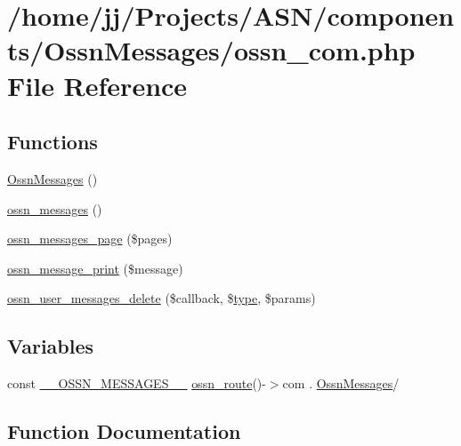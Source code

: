 \hypertarget{_ossn_messages_2ossn__com_8php}{}\section{/home/jj/\+Projects/\+A\+S\+N/components/\+Ossn\+Messages/ossn\+\_\+com.php File Reference}
\label{_ossn_messages_2ossn__com_8php}
\subsection*{Functions}
\begin{DoxyCompactItemize}
\item 
\hyperlink{_ossn_messages_2ossn__com_8php_a02b4ebeb818a50548ad2ef73014ffd62}{Ossn\+Messages} ()
\item 
\hyperlink{_ossn_messages_2ossn__com_8php_a581dd22d991091d76faf213b6e24ef2e}{ossn\+\_\+messages} ()
\item 
\hyperlink{_ossn_messages_2ossn__com_8php_a346171c5f5168639c7db84f2573ea18d}{ossn\+\_\+messages\+\_\+page} (\$pages)
\item 
\hyperlink{_ossn_messages_2ossn__com_8php_a27fd4a27b4ea1055b716471258f29476}{ossn\+\_\+message\+\_\+print} (\$message)
\item 
\hyperlink{_ossn_messages_2ossn__com_8php_ad4615fd025baaa4145b80a3d08315303}{ossn\+\_\+user\+\_\+messages\+\_\+delete} (\$callback, \$\hyperlink{_ossn_wall_2actions_2wall_2post_2group_8php_a2dc1bb4e1ed0029daa81ac0776b14b51}{type}, \$params)
\end{DoxyCompactItemize}
\subsection*{Variables}
\begin{DoxyCompactItemize}
\item 
const \hyperlink{_ossn_messages_2ossn__com_8php_ae497e888b1480059e48441dfd838574b}{\+\_\+\+\_\+\+O\+S\+S\+N\+\_\+\+M\+E\+S\+S\+A\+G\+E\+S\+\_\+\+\_\+} \hyperlink{ossn_8lib_8route_8php_ac23dc424aa33dcd57982b72f4ed1217e}{ossn\+\_\+route}()-\/$>$com . \textquotesingle{}\hyperlink{class_ossn_messages}{Ossn\+Messages}/\textquotesingle{}
\end{DoxyCompactItemize}


\subsection{Function Documentation}
